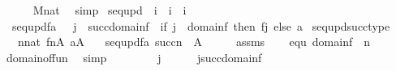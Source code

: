 \begin{isabellebody}
\ \ \ \ \isamarkupfalse%
\ M{\isacharunderscore}{\kern0pt}nat\ \isamarkupfalse%
\ simp\isanewline
{}\isamarkupfalse%
%
\endisatagproof
{\isafoldproof}%
%
\isadelimproof
\isanewline
%
\endisadelimproof
\isanewline
{}\isamarkupfalse%
\ seq{\isacharunderscore}{\kern0pt}upd\ {\isacharcolon}{\kern0pt}{\isacharcolon}{\kern0pt}\ {\isachardoublequoteopen}i\ {\isasymRightarrow}\ i\ {\isasymRightarrow}\ i{\isachardoublequoteclose}\ \isanewline
\ \ {\isachardoublequoteopen}seq{\isacharunderscore}{\kern0pt}upd{\isacharparenleft}{\kern0pt}f{\isacharcomma}{\kern0pt}a{\isacharparenright}{\kern0pt}\ {\isasymequiv}\ {\isasymlambda}\ j\ {\isasymin}\ succ{\isacharparenleft}{\kern0pt}domain{\isacharparenleft}{\kern0pt}f{\isacharparenright}{\kern0pt}{\isacharparenright}{\kern0pt}\ {\isachardot}{\kern0pt}\ if\ j\ {\isacharless}{\kern0pt}\ domain{\isacharparenleft}{\kern0pt}f{\isacharparenright}{\kern0pt}\ then\ f{\isacharbackquote}{\kern0pt}j\ else\ a{\isachardoublequoteclose}\isanewline
\isanewline
{}\isamarkupfalse%
\ seq{\isacharunderscore}{\kern0pt}upd{\isacharunderscore}{\kern0pt}succ{\isacharunderscore}{\kern0pt}type\ {\isacharcolon}{\kern0pt}\ \isanewline
\ \ \ {\isachardoublequoteopen}n{\isasymin}nat{\isachardoublequoteclose}\ {\isachardoublequoteopen}f{\isasymin}n{\isasymrightarrow}A{\isachardoublequoteclose}\ {\isachardoublequoteopen}a{\isasymin}A{\isachardoublequoteclose}\isanewline
\ \ \ {\isachardoublequoteopen}seq{\isacharunderscore}{\kern0pt}upd{\isacharparenleft}{\kern0pt}f{\isacharcomma}{\kern0pt}a{\isacharparenright}{\kern0pt}{\isasymin}\ succ{\isacharparenleft}{\kern0pt}n{\isacharparenright}{\kern0pt}\ {\isasymrightarrow}\ A{\isachardoublequoteclose}\isanewline
%
\isadelimproof
%
\endisadelimproof
%
\isatagproof
{}\isamarkupfalse%
\ {\isacharminus}{\kern0pt}\isanewline
\ \ \isamarkupfalse%
\ assms\isanewline
\ \ \isamarkupfalse%
\ equ{\isacharcolon}{\kern0pt}\ {\isachardoublequoteopen}domain{\isacharparenleft}{\kern0pt}f{\isacharparenright}{\kern0pt}\ {\isacharequal}{\kern0pt}\ n{\isachardoublequoteclose}\ \isamarkupfalse%
\ domain{\isacharunderscore}{\kern0pt}of{\isacharunderscore}{\kern0pt}fun\ \isamarkupfalse%
\ simp\isanewline
\ \ \isacommand{{\isacharbraceleft}{\kern0pt}}\isamarkupfalse%
\isanewline
\ \ \ \ \isamarkupfalse%
\ j\isanewline
\ \ \ \ \isamarkupfalse%
\ {\isachardoublequoteopen}j{\isasymin}succ{\isacharparenleft}{\kern0pt}domain{\isacharparenleft}{\kern0pt}f{\isacharparenright}{\kern0pt}{\isacharparenright}{\kern0pt}{\isachardoublequoteclose}\isanewline

\end{isabellebody}
